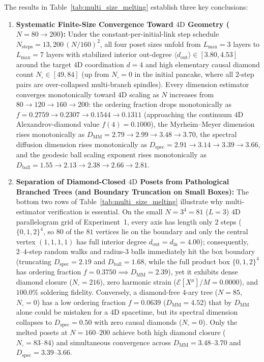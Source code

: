 \documentclass[11pt,a4paper]{article}
\theoremstyle{definition}
\theoremstyle{remark}
\begin{document}
The results in Table~\ref{tab:multi_size_melting} establish three key conclusions:
\begin{enumerate}
    \item \textbf{Systematic Finite-Size Convergence Toward $4\text{D}$ Geometry ($N = 80 \to 200$):} Under the constant-per-initial-link step schedule $N_{\mathrm{steps}} = 13{,}200\,(N/160)^2$, all four poset sizes unfold from $L_{\max} = 3$ layers to $L_{\max} = 7$ layers with stabilized interior out-degree $\langle d_{\mathrm{out}}\rangle \in [3.80, 4.53]$ around the target $4\text{D}$ coordination $d = 4$ and high elementary causal diamond count $N_\square \in [49, 84]$ (up from $N_\square = 0$ in the initial pancake, where all $2$-step pairs are over-collapsed multi-branch spindles). Every dimension estimator converges monotonically toward $4\text{D}$ scaling as $N$ increases from $80 \to 120 \to 160 \to 200$: the ordering fraction drops monotonically as $f = 0.2759 \to 0.2307 \to 0.1544 \to 0.1311$ (approaching the continuum $4\text{D}$ Alexandrov-diamond value $f(4) = 0.1000$), the Myrheim--Meyer dimension rises monotonically as $D_{\mathrm{MM}} = 2.79 \to 2.99 \to 3.48 \to 3.70$, the spectral diffusion dimension rises monotonically as $D_{\mathrm{spec}} = 2.91 \to 3.14 \to 3.39 \to 3.66$, and the geodesic ball scaling exponent rises monotonically as $D_{\mathrm{ball}} = 1.55 \to 2.13 \to 2.38 \to 2.66 \to 2.81$.
    \item \textbf{Separation of Diamond-Closed $4\text{D}$ Posets from Pathological Branched Trees (and Boundary Truncation on Small Boxes):} The bottom two rows of Table~\ref{tab:multi_size_melting} illustrate why multi-estimator verification is essential. On the small $N = 3^4 = 81$ ($L = 3$) $4\text{D}$ parallelogram grid of Experiment~1, every axis has length only $2$ steps ($\{0, 1, 2\}^4$, so $80$ of the $81$ vertices lie on the boundary and only the central vertex $(1,1,1,1)$ has full interior degree $d_{\mathrm{out}} = d_{\mathrm{in}} = 4.00$); consequently, $2\text{--}4$-step random walks and radius-$3$ balls immediately hit the box boundary (truncating $D_{\mathrm{spec}} = 2.19$ and $D_{\mathrm{ball}} = 1.68$, while the full product box $\{0,1,2\}^4$ has ordering fraction $f = 0.3750 \implies D_{\mathrm{MM}} = 2.39$), yet it exhibits dense diamond closure ($N_\square = 216$), zero harmonic strain ($\mathcal{E}[X^\mu]/M = 0.0000$), and $100.0\%$ soldering fidelity. Conversely, a diamond-free $4$-ary tree ($N = 85$, $N_\square = 0$) has a low ordering fraction $f = 0.0639$ ($D_{\mathrm{MM}} = 4.52$) that by $D_{\mathrm{MM}}$ alone could be mistaken for a $4\text{D}$ spacetime, but its spectral dimension collapses to $D_{\mathrm{spec}} = 0.50$ with zero causal diamonds ($N_\square = 0$). Only the melted posets at $N = 160\text{--}200$ achieve both high diamond closure ($N_\square = 83\text{--}84$) and simultaneous convergence across $D_{\mathrm{MM}} = 3.48\text{--}3.70$ and $D_{\mathrm{spec}} = 3.39\text{--}3.66$.

\end{enumerate}
\end{document}
